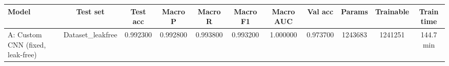 \begin{tabular}{lcccccccccc}
\toprule
Model & Test set & Test acc & Macro P & Macro R & Macro F1 & Macro AUC & Val acc & Params & Trainable & Train time \\
\midrule
A: Custom CNN (fixed, leak-free) & Dataset_leakfree & 0.992300 & 0.992800 & 0.993800 & 0.993200 & 1.000000 & 0.973700 & 1243683 & 1241251 & 144.7 min \\
\bottomrule
\end{tabular}
